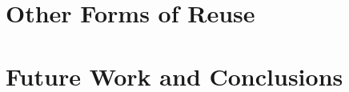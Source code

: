 \section{Other Forms of Reuse}
\label{sec-other}

\section{Future Work and Conclusions}
\label{sec-conclusion}
